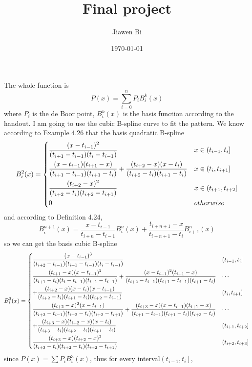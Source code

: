 \documentclass[]{article}
\title{Final project}
\author{Jiawen Bi}
\date{\today}
\begin{document}
\maketitle
The whole function is $$
    P(x) = \sum_{i=0}^n P_i B_i^k(x)
   	$$
where $P_i$ is the de Boor point, $B_i^k(x)$ is the basis function according to the handout. 
I am going to use the cubic B-spline curve to fit the pattern.
We know according to Example 4.26 that the basis quadratic B-spline $$
	B_i^2(x) = \begin{dcases}
	\frac{(x-t_{i-1})^2}{(t_{i+1}-t_{i-1})(t_i - t_{i-1})} & x\in \left(t_{i-1},t_i\right] \\
	\frac{(x-t_{i-1})(t_{i+1}-x)}{(t_{i+1}-t_{i-1})(t_{i+1}-t_i)} + \frac{(t_{i+2}-x)(x-t_i)}{(t_{i+2}-t_i)(t_{i+1}-t_i)} & x\in \left(t_i,t_{i+1}\right] \\
	\frac{(t_{i+2}-x)^2}{(t_{i+2}-t_i)(t_{i+2}-t_{i+1})} & x\in \left(t_{i+1},t_{i+2} \right] \\
	0 & otherwise
	\end{dcases}
$$
and according to Definition 4.24, $$
	B_i^{n+1}(x) = \frac{x-t_{i-1}}{t_{i+n}-t_{i-1}}B_i^n(x) + \frac{t_{i+n+1} - x}{t_{i+n+1}-t_i} B_{i+1}^n(x)
$$
so we can get the basis cubic B-spline $$
	B_i^3(x) = \begin{dcases}
	\frac{(x-t_{i-1})^3}{(t_{i+2}-t_{i-1})(t_{i+1}-t_{i-1})(t_i-t_{i-1})} & \left(t_{i-1},t_i\right] \\
	\frac{(t_{i+1}-x)(x-t_{i-1})^2}{(t_{i+1}-t_i)(t_i-t_{i-1})(t_{i+1}-t_{i-1})} + \frac{(x-t_{i-1})^2(t_{i+1}-x)}{(t_{i+2}-t_{i-1})(t_{i+1}-t_{i-1})(t_{i+1}-t_i)} & \cdots \\ 
	 + \frac{(t_{i+2}-x)(x-t_i)(x-t_{i-1})}{(t_{i+2}-t_i)(t_{i+1}-t_i)(t_{i+2}-t_{i-1})} & \left(t_i,t_{i+1} \right] \\
	\frac{(t_{i+2}-x)^2(x-t_{i-1})}{(t_{i+2}-t_{i-1})(t_{i+2}-t_i)(t_{i+2}-t_{i+1})} + \frac{(t_{i+3}-x)(x-t_{i-1})(t_{i+1}-x)}{(t_{i+1}-t_{i-1})(t_{i+1}-t_i)(t_{i+3}-t_i)} & \cdots\\
	+\frac{(t_{i+3}-x)(t_{i+2}-x)(x-t_i)}{(t_{i+3}-t_i)(t_{i+2}-t_i)(t_{i+1}-t_i)} & \left(t_{i+1},t_{i+2} \right] \\
	\frac{(t_{i+3}-x)(t_{i+2}-x)^2}{(t_{i+3}-t_i)(t_{i+2}-t_i)(t_{i+2}-t_{i+1})} & \left(t_{i+2},t_{i+3} \right]
	\end{dcases}
$$
since $\displaystyle P(x) = \sum P_iB_i^3(x) $, thus for every interval$\displaystyle\left(t_{i-1},t_i\right]$,
\end{document}

